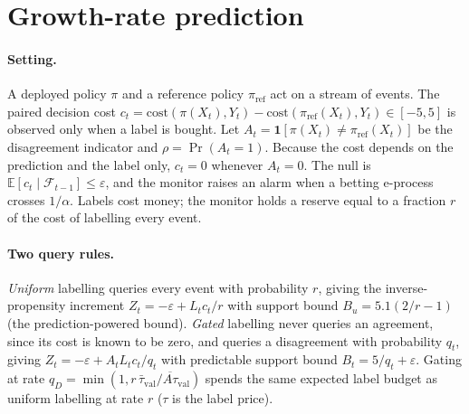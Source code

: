 
\section{Growth-rate prediction}\label{sec:prediction}

\paragraph{Setting.}
A deployed policy $\pi$ and a reference policy $\pi_{\mathrm{ref}}$ act on a stream of events. The paired
decision cost $c_t = \mathrm{cost}(\pi(X_t),Y_t)-\mathrm{cost}(\pi_{\mathrm{ref}}(X_t),Y_t)\in[-5,5]$ is observed only
when a label is bought. Let $A_t=\mathbf 1[\pi(X_t)\neq\pi_{\mathrm{ref}}(X_t)]$ be the disagreement indicator and $\rho=\Pr(A_t=1)$.
Because the cost depends on the prediction and the label only, $c_t=0$ whenever $A_t=0$. The null is
$\mathbb E[c_t\mid\mathcal F_{t-1}]\le\varepsilon$, and the monitor raises an alarm when a betting e-process crosses $1/\alpha$.
Labels cost money; the monitor holds a reserve equal to a fraction $r$ of the cost of labelling every event.

\paragraph{Two query rules.}
\emph{Uniform} labelling queries every event with probability $r$, giving the inverse-propensity increment
$Z_t=-\varepsilon+L_tc_t/r$ with support bound $B_u=5.1(2/r-1)$ (the prediction-powered bound).
\emph{Gated} labelling never queries an agreement, since its cost is known to be zero, and queries a disagreement with
probability $q_t$, giving $Z_t=-\varepsilon+A_tL_tc_t/q_t$ with predictable support bound $B_t=5/q_t+\varepsilon$.
Gating at rate $q_D=\min(1,r\,\bar\tau_{\mathrm{val}}/\overline{A\tau}_{\mathrm{val}})$ spends the same expected label budget
as uniform labelling at rate $r$ ($\tau$ is the label price).

